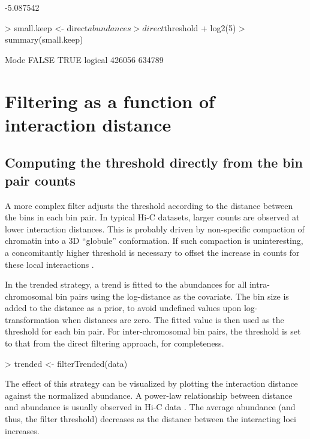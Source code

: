 \documentclass[12pt]{report}
\renewenvironment{Schunk}{\vspace{0pt}}{\vspace{0pt}}
\begin{document}
\begin{Schunk}
\begin{Soutput}
[1] -5.087542
\end{Soutput}
\begin{Sinput}
> small.keep <- direct$abundances > direct$threshold + log2(5)
> summary(small.keep)
\end{Sinput}
\begin{Soutput}
   Mode   FALSE    TRUE 
logical  426056  634789 
\end{Soutput}
\end{Schunk}

\section{Filtering as a function of interaction distance}

\subsection{Computing the threshold directly from the bin pair counts}
A more complex filter adjusts the threshold according to the distance between the bins in each bin pair. 
In typical Hi-C datasets, larger counts are observed at lower interaction distances.
This is probably driven by non-specific compaction of chromatin into a 3D ``globule'' conformation.
If such compaction is uninteresting, a concomitantly higher threshold is necessary to offset the increase in counts for these local interactions \citep{lin2012global}.

In the trended strategy, a trend is fitted to the abundances for all intra-chromosomal bin pairs using the log-distance as the covariate. 
The bin size is added to the distance as a prior, to avoid undefined values upon log-transformation when distances are zero.
The fitted value is then used as the threshold for each bin pair.
For inter-chromosomal bin pairs, the threshold is set to that from the direct filtering approach, for completeness.

\begin{Schunk}
\begin{Sinput}
> trended <- filterTrended(data)
\end{Sinput}
\end{Schunk}

The effect of this strategy can be visualized by plotting the interaction distance against the normalized abundance.
A power-law relationship between distance and abundance is usually observed in Hi-C data \citep{lieberman2009comprehensive}. 
The average abundance (and thus, the filter threshold) decreases as the distance between the interacting loci increases.
\end{document}
